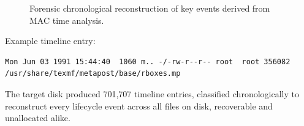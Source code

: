 \begin{figure}[htbp]
\caption{Forensic chronological reconstruction of key events derived from MAC time analysis.}
\label{fig:cronologia_mactime}
\end{figure}

Example timeline entry:

\vspace{1em}

{\footnotesize
\begin{lstlisting}[style=terminal]
Mon Jun 03 1991 15:44:40  1060 m.. -/-rw-r--r-- root  root 356082 /usr/share/texmf/metapost/base/rboxes.mp
\end{lstlisting}
}

\vspace{1em}

The target disk produced 701,707 timeline entries, classified chronologically to reconstruct every lifecycle event across all files on disk, recoverable and unallocated alike.

\vspace{1em}


